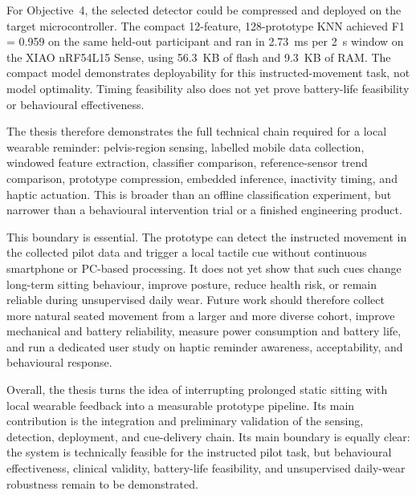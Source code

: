 For Objective~4, the selected detector could be compressed and deployed on the target microcontroller. The compact 12-feature, 128-prototype KNN achieved F1 = 0.959 on the same held-out participant and ran in 2.73~ms per 2~s window on the XIAO nRF54L15 Sense, using 56.3~KB of flash and 9.3~KB of RAM. The compact model demonstrates deployability for this instructed-movement task, not model optimality. Timing feasibility also does not yet prove battery-life feasibility or behavioural effectiveness.

The thesis therefore demonstrates the full technical chain required for a local wearable reminder: pelvis-region sensing, labelled mobile data collection, windowed feature extraction, classifier comparison, reference-sensor trend comparison, prototype compression, embedded inference, inactivity timing, and haptic actuation. This is broader than an offline classification experiment, but narrower than a behavioural intervention trial or a finished engineering product.

This boundary is essential. The prototype can detect the instructed movement in the collected pilot data and trigger a local tactile cue without continuous smartphone or PC-based processing. It does not yet show that such cues change long-term sitting behaviour, improve posture, reduce health risk, or remain reliable during unsupervised daily wear. Future work should therefore collect more natural seated movement from a larger and more diverse cohort, improve mechanical and battery reliability, measure power consumption and battery life, and run a dedicated user study on haptic reminder awareness, acceptability, and behavioural response.

Overall, the thesis turns the idea of interrupting prolonged static sitting with local wearable feedback into a measurable prototype pipeline. Its main contribution is the integration and preliminary validation of the sensing, detection, deployment, and cue-delivery chain. Its main boundary is equally clear: the system is technically feasible for the instructed pilot task, but behavioural effectiveness, clinical validity, battery-life feasibility, and unsupervised daily-wear robustness remain to be demonstrated.
